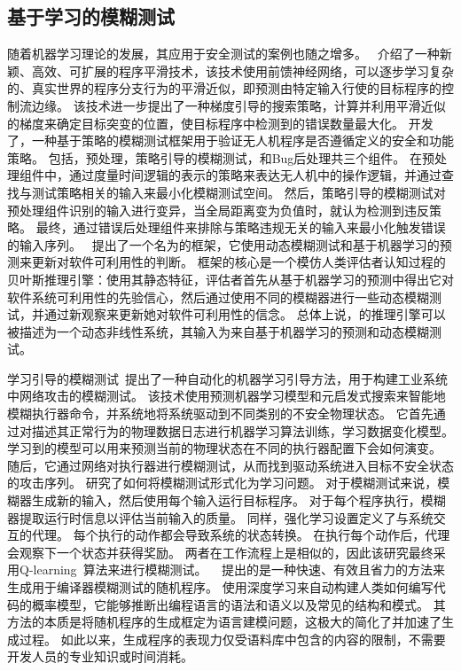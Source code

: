 \subsection{基于学习的模糊测试}
随着机器学习理论的发展，其应用于安全测试的案例也随之增多。
~\cite{she2019neuzz}介绍了一种新颖、高效、可扩展的程序平滑技术，该技术使用前馈神经网络，可以逐步学习复杂的、真实世界的程序分支行为的平滑近似，即预测由特定输入行使的目标程序的控制流边缘。
该技术进一步提出了一种梯度引导的搜索策略，计算并利用平滑近似的梯度来确定目标突变的位置，使目标程序中检测到的错误数量最大化。
\citet{kim2021pgfuzz}开发了，一种基于策略的模糊测试框架用于验证无人机程序是否遵循定义的安全和功能策略。
包括，预处理，策略引导的模糊测试，和Bug后处理共三个组件。
在预处理组件中，通过度量时间逻辑的表示的策略来表达无人机中的操作逻辑，并通过查找与测试策略相关的输入来最小化模糊测试空间。
然后，策略引导的模糊测试对预处理组件识别的输入进行变异，当全局距离变为负值时，就认为检测到违反策略。
最终，通过错误后处理组件来排除与策略违规无关的输入来最小化触发错误的输入序列。
~\cite{yan2017exploitmeter}提出了一个名为的框架，它使用动态模糊测试和基于机器学习的预测来更新对软件可利用性的判断。
框架的核心是一个模仿人类评估者认知过程的贝叶斯推理引擎：使用其静态特征，评估者首先从基于机器学习的预测中得出它对软件系统可利用性的先验信心，然后通过使用不同的模糊器进行一些动态模糊测试，并通过新观察来更新她对软件可利用性的信念。
总体上说，的推理引擎可以被描述为一个动态非线性系统，其输入为来自基于机器学习的预测和动态模糊测试。

学习引导的模糊测试~\cite{chen2019learning}提出了一种自动化的机器学习引导方法，用于构建工业系统中网络攻击的模糊测试。
该技术使用预测机器学习模型和元启发式搜索来智能地模糊执行器命令，并系统地将系统驱动到不同类别的不安全物理状态。
它首先通过对描述其正常行为的物理数据日志进行机器学习算法训练，学习数据变化模型。
学习到的模型可以用来预测当前的物理状态在不同的执行器配置下会如何演变。
随后，它通过网络对执行器进行模糊测试，从而找到驱动系统进入目标不安全状态的攻击序列。
\citet{bottinger2018deep}研究了如何将模糊测试形式化为学习问题。
对于模糊测试来说，模糊器生成新的输入，然后使用每个输入运行目标程序。 
对于每个程序执行，模糊器提取运行时信息以评估当前输入的质量。
同样，强化学习设置定义了与系统交互的代理。 
每个执行的动作都会导致系统的状态转换。
在执行每个动作后，代理会观察下一个状态并获得奖励。 
两者在工作流程上是相似的，因此该研究最终采用Q-learning~\cite{mnih2013playing}算法来进行模糊测试。
~\cite{cummins2018compiler} 提出的是一种快速、有效且省力的方法来生成用于编译器模糊测试的随机程序。
使用深度学习来自动构建人类如何编写代码的概率模型，它能够推断出编程语言的语法和语义以及常见的结构和模式。
其方法的本质是将随机程序的生成框定为语言建模问题，这极大的简化了并加速了生成过程。
如此以来，生成程序的表现力仅受语料库中包含的内容的限制，不需要开发人员的专业知识或时间消耗。

